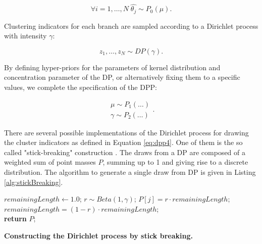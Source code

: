 \begin{equation}
\forall i=1,\ldots,N\;\hat{\theta_{j}}\sim P_{0}\left(\mu\right).
\label{eq:dpp3}
\end{equation}

\noindent
Clustering indicators for each branch are sampled according to a Dirichlet process with intensity $\gamma$:

\begin{equation}
z_{1},\ldots,z_{N}\sim DP(\gamma).
\label{eq:dpp4}
\end{equation}

\noindent
By defining hyper-priors for the parameters of kernel distribution and concentration parameter of the DP, or alternatively fixing them to a specific values, we complete the specification of the DPP:

\begin{equation}
\begin{array}{c}
\mu\sim P_{1}(\ldots)\\
\gamma\sim P_{2}(\ldots)
\end{array}.
\label{eq:dpp5}
\end{equation}

There are several possible implementations of the Dirichlet process for drawing the cluster indicators as defined in Equation \ref{eq:dpp4}. 
One of them is the so called "stick-breaking" construction \citep{Sethuraman94}.
The draws from a DP are composed of a weighted sum of point masses $P$, summing up to 1 and giving rise to a discrete distribution.
The algorithm to generate a single draw from DP is given in Listing \ref{alg:stickBreaking}.

\begin{algorithm}[H]
\begin{center}
\begin{algorithmic}[1]
\footnotesize{
%
\State $remainingLength \gets 1.0$;
%
%
\State $r\sim Beta\left(1,\gamma\right)$;
%
\State $P\left[j\right]=r \cdot remainingLength$;
%
\State $remainingLength=\left(1-r\right) \cdot remainingLength$;
%
\EndFor \\
%
 \textbf{return} $P$;
}
\end{algorithmic}
\end{center}
\caption{ { \footnotesize {\bf Constructing the Dirichlet process by stick breaking.} } }
\label{alg:stickBreaking}
\end{algorithm}

